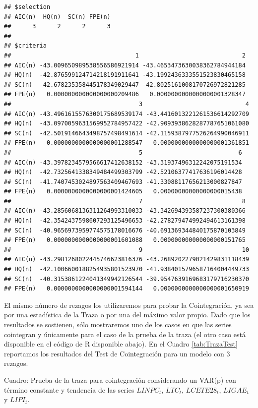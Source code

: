 \documentclass[
]{book}
\begin{document}
\begin{verbatim}
## $selection
## AIC(n)  HQ(n)  SC(n) FPE(n) 
##      3      2      2      3 
## 
## $criteria
##                                   1                             2
## AIC(n) -43.009650989538556586921914 -43.4653473630038362784944184
## HQ(n)  -42.876599124714218191911641 -43.1992436333551523830465158
## SC(n)  -42.678235358445178349029447 -42.8025161008170726972821285
## FPE(n)   0.000000000000000000209486   0.0000000000000000001328347
##                                    3                             4
## AIC(n) -43.4961615576300175689539174 -43.4416013221261536614292709
## HQ(n)  -43.0970059631569952784957422 -42.9093938628287787651061080
## SC(n)  -42.5019146643498757498491614 -42.1159387977526264990046911
## FPE(n)   0.0000000000000000001288547   0.0000000000000000001361851
##                                    5                           6
## AIC(n) -43.3978234579566617412638152 -43.31937496312242075191534
## HQ(n)  -42.7325641338349484499303799 -42.52106377417636196014428
## SC(n)  -41.7407453024897563409467693 -41.33088117656213000827847
## FPE(n)   0.0000000000000000001424605   0.00000000000000000015438
##                                    7                            8
## AIC(n) -43.2856068136311264993310033 -43.342694393587237300380366
## HQ(n)  -42.3542437598607293125496653 -42.278279474992494613161398
## SC(n)  -40.9656973959774575178016676 -40.691369344840175870103849
## FPE(n)   0.0000000000000000001601088   0.000000000000000000151765
##                                    9                            10
## AIC(n) -43.2981268022445746623816376 -43.2689202279021429831118439
## HQ(n)  -42.1006600188254935801523970 -41.9384015796587164004449733
## SC(n)  -40.3153861224041349942126544 -39.9547639169683179716230370
## FPE(n)   0.0000000000000000001594144   0.0000000000000000001650919
\end{verbatim}

El mismo número de rezagos los utilizaremos para probar la Cointegración, ya sea por una estadística de la Traza o por una del máximo valor propio. Dado que los resultados se sostienen, sólo mostraremos uno de los casos en que las series cointegran y únicamente para el caso de la prueba de la traza (el otro caso está disponible en el código de R disponible abajo). En el Cuadro \ref{tab:TrazaTest} reportamos los resultados del Test de Cointegración para un modelo con 3 rezagos.

Cuadro: \label{tab:TrazaTest} Prueba de la traza para cointegración considerando un VAR(p) con término constante y tendencia de las series \(LINPC_t\), \(LTC_t\), \(LCETE28_t\), \(LIGAE_t\) y \(LIPI_t\).
\end{document}
